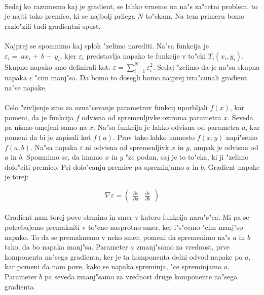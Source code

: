 \paragraph{}
Sedaj ko razumemo kaj je gradient, se lahko vrnemo na na"s za"cetni problem, to je najti tako premico, ki se najbolj prilega $N$ to"ckam. Na tem primeru bomo razlo"zili tudi gradientni spust.

\paragraph{}
Najprej se spomnimo kaj sploh "zelimo narediti. Na"sa funkcija je $\varepsilon_i = ~ax_i + ~b - ~y_i$, kjer $\varepsilon_i$ predstavlja napako te funkcije v to"cki $T_i(x_i, y_i)$. Skupno napako smo definirali kot: $\varepsilon = \sum_{i=1}^{N} \varepsilon_i^2$. Sedaj "zelimo da je na"sa skupna napaka $\varepsilon$ "cim manj"sa. Da bomo to dosegli bomo najprej izra"cunali gradient na"se napake.

\paragraph{}
Celo "zivljenje smo za ozna"cevanje parametrov funkcij uporbljali $f(x)$, kar pomeni, da je funkcija $f$ odvisna od spremenljivke oziroma parametra $x$. Seveda pa nismo omejeni samo na $x$. Na"sa funkcija je lahko odvisna od parametra $a$, kar pomeni da bi jo zapisali kot $f(a)$. Prav tako lahko namesto $f(x,y)$ napi"semo $f(a,b)$. Na"sa napaka $\varepsilon$ ni odvisna od spremenljivk $x$ in $y$, ampak je odvisna od $a$ in $b$. Spomnimo se, da imamo $x$ in $y$ "ze podan, saj je to to"cka, ki ji "zelimo dolo"citi premico. Pri dolo"canju premice pa spreminjamo $a$ in $b$. Gradient napake je torej:

\[\nabla \varepsilon = \begin{pmatrix}
\frac{\partial \varepsilon}{\partial a} &
\frac{\partial \varepsilon}{\partial b}
\end{pmatrix} \]

\paragraph{}
Gradient nam torej pove strmino in smer v katero funkcija nara"s"ca. Mi pa se potrebujemo premakniti v to"cno nasprotno smer, ker i"s"cemo "cim manj"so napako. To da se premaknemo v neko smer, pomeni da spremenimo na"s $a$ in $b$ tako, da bo napaka manj"sa. Parameter $a$ zmanj"samo za vrednost, prve komponenta na"sega gradienta, ker je ta komponenta delni odvod napake po $a$, kar pomeni da nam pove, kako se napaka spreminja, "ce spreminjamo $a$. Parameter $b$ pa seveda zmanj"samo za vrednost druge komponente na"sega gradienta.

